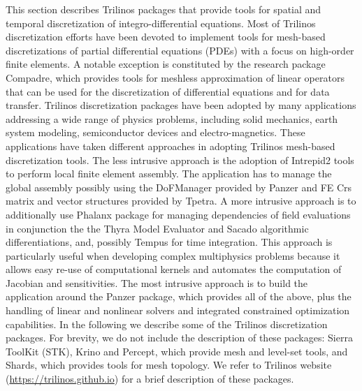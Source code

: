 This section describes Trilinos packages that provide tools for spatial and temporal discretization of integro-differential equations. Most of Trilinos discretization efforts have been devoted to implement tools for mesh-based discretizations of partial differential equations (PDEs) with a focus on high-order finite elements. A notable exception is constituted by the research package Compadre, which provides tools for meshless approximation of linear operators that can be used for the discretization of differential equations and for data transfer.
Trilinos discretization packages have been adopted by many applications addressing a wide range of physics problems, including solid mechanics, earth system modeling, semiconductor devices and electro-magnetics. These applications have taken different approaches in adopting Trilinos mesh-based discretization tools. The less intrusive approach is the adoption of Intrepid2 tools to perform local finite element assembly. The application has to manage the global assembly possibly using the DoFManager provided by Panzer and FE Crs matrix and vector structures provided by Tpetra.  
A more intrusive approach is to additionally use Phalanx package for managing dependencies of field evaluations in conjunction the the Thyra Model Evaluator and Sacado algorithmic differentiations, and, possibly Tempus for time integration. This approach is particularly useful when developing complex multiphysics problems because it allows easy re-use of computational kernels and automates the computation of Jacobian and sensitivities.
The most intrusive approach is to build the application around the Panzer package, which provides all of the above, plus the handling of linear and nonlinear solvers and integrated constrained optimization capabilities.
In the following we describe some of the Trilinos discretization packages. For brevity, we do not include the description of these packages: Sierra ToolKit (STK), Krino and Percept, which provide mesh and level-set tools, and Shards, which provides tools for mesh topology. We refer to Trilinos website (\url{https://trilinos.github.io}) for a brief description of these packages.



